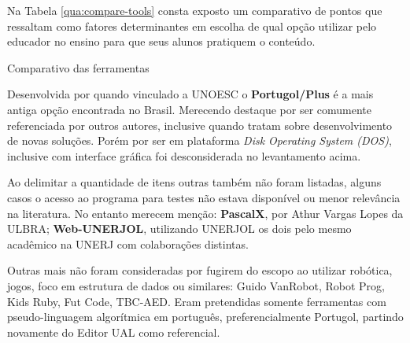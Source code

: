 Na Tabela \ref{qua:compare-tools} consta exposto um comparativo de pontos que ressaltam como fatores determinantes em escolha de qual opção utilizar pelo educador no ensino para que seus alunos pratiquem o conteúdo.

\begin{table}[h]
\centering
\caption{Comparativo das ferramentas}\label{qua:compare-tools}
  \caption*{\ifdraft{\color{green}}{}\footnotesize Fonte: Produção do autor.}
\end{table}

Desenvolvida por  quando vinculado a UNOESC o \textbf{Portugol/Plus} é a mais antiga opção encontrada no Brasil. Merecendo destaque por ser comumente referenciada por outros autores, inclusive quando tratam sobre desenvolvimento de novas soluções. Porém por ser em plataforma \textit{Disk Operating System (DOS)}, inclusive com interface gráfica foi desconsiderada no levantamento acima.

Ao delimitar a quantidade de itens outras também não foram listadas, alguns casos o acesso ao programa para testes não estava disponível ou menor relevância na literatura. No entanto  merecem menção: \textbf{PascalX}, por Athur Vargas Lopes da ULBRA; \textbf{Web-UNERJOL}\nocite{ferrandin2005etal}, utilizando UNERJOL os dois pelo mesmo acadêmico na UNERJ com colaborações distintas.

Outras mais não foram consideradas por fugirem do escopo ao utilizar robótica, jogos, foco em estrutura de dados ou similares: Guido VanRobot, Robot Prog, Kids Ruby, Fut Code, TBC-AED. Eram pretendidas somente ferramentas com pseudo-linguagem algorítmica em português, preferencialmente Portugol, partindo novamente do Editor UAL como referencial.

